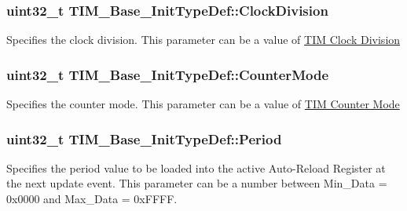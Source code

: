 \subsubsection[{\texorpdfstring{Clock\+Division}{ClockDivision}}]{\setlength{\rightskip}{0pt plus 5cm}uint32\+\_\+t T\+I\+M\+\_\+\+Base\+\_\+\+Init\+Type\+Def\+::\+Clock\+Division}\hypertarget{struct_t_i_m___base___init_type_def_ade59c3a547a5409da845592f30596d17}{}\label{struct_t_i_m___base___init_type_def_ade59c3a547a5409da845592f30596d17}
Specifies the clock division. This parameter can be a value of \hyperlink{group___t_i_m___clock_division}{T\+IM Clock Division} 
\subsubsection[{\texorpdfstring{Counter\+Mode}{CounterMode}}]{\setlength{\rightskip}{0pt plus 5cm}uint32\+\_\+t T\+I\+M\+\_\+\+Base\+\_\+\+Init\+Type\+Def\+::\+Counter\+Mode}\hypertarget{struct_t_i_m___base___init_type_def_a16d0c02a8f35426360a64c0706656e35}{}\label{struct_t_i_m___base___init_type_def_a16d0c02a8f35426360a64c0706656e35}
Specifies the counter mode. This parameter can be a value of \hyperlink{group___t_i_m___counter___mode}{T\+IM Counter Mode} 
\subsubsection[{\texorpdfstring{Period}{Period}}]{\setlength{\rightskip}{0pt plus 5cm}uint32\+\_\+t T\+I\+M\+\_\+\+Base\+\_\+\+Init\+Type\+Def\+::\+Period}\hypertarget{struct_t_i_m___base___init_type_def_a8fab2bc184bb756763ff59c729b5be55}{}\label{struct_t_i_m___base___init_type_def_a8fab2bc184bb756763ff59c729b5be55}
Specifies the period value to be loaded into the active Auto-\/\+Reload Register at the next update event. This parameter can be a number between Min\+\_\+\+Data = 0x0000 and Max\+\_\+\+Data = 0x\+F\+F\+FF. 
